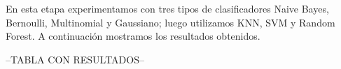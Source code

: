 En esta etapa experimentamos con tres tipos de clasificadores Naive Bayes, Bernoulli, Multinomial y Gaussiano; luego utilizamos KNN, SVM y Random Forest. A continuación mostramos los resultados obtenidos.

--TABLA CON RESULTADOS--

